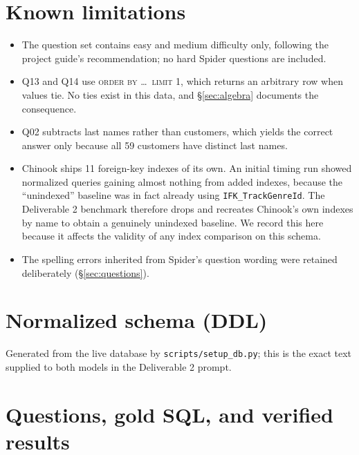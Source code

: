 \documentclass[11pt]{article}
\begin{document}
\section{Known limitations}\label{sec:limits}

\begin{itemize}[leftmargin=*,topsep=2pt,itemsep=3pt]
  \item The question set contains easy and medium difficulty only, following the project guide's
    recommendation; no hard Spider questions are included.
  \item Q13 and Q14 use \textsc{order by \ldots\ limit 1}, which returns an arbitrary row when
    values tie. No ties exist in this data, and \S\ref{sec:algebra} documents the consequence.
  \item Q02 subtracts last names rather than customers, which yields the correct answer only
    because all 59 customers have distinct last names.
  \item Chinook ships 11 foreign-key indexes of its own. An initial timing run showed normalized
    queries gaining almost nothing from added indexes, because the ``unindexed'' baseline was in
    fact already using \texttt{IFK\_TrackGenreId}. The Deliverable 2 benchmark therefore drops
    and recreates Chinook's own indexes by name to obtain a genuinely unindexed baseline. We
    record this here because it affects the validity of any index comparison on this schema.
  \item The spelling errors inherited from Spider's question wording were retained deliberately
    (\S\ref{sec:questions}).
\end{itemize}

\appendix
\section{Normalized schema (DDL)}\label{app:ddl}

Generated from the live database by \texttt{scripts/setup\_db.py}; this is the exact text supplied
to both models in the Deliverable 2 prompt.



\section{Questions, gold SQL, and verified results}\label{app:questions}


\end{document}
